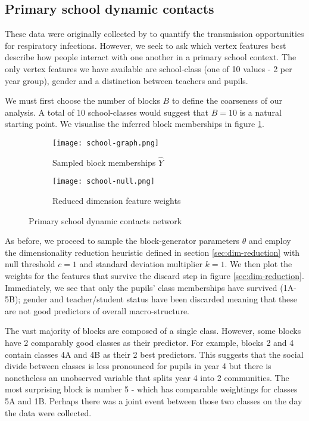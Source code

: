 \FloatBarrier
\subsection{Primary school dynamic contacts}

These data were originally collected by \citet{schools} to quantify the transmission opportunities for respiratory infections. However, we seek to ask which vertex features best describe how people interact with one another in a primary school context. The only vertex features we have available are school-class (one of 10 values - 2 per year group), gender and a distinction between teachers and pupils.

We must first choose the number of blocks $B$ to define the coarseness of our analysis. A total of 10 school-classes would suggest that $B=10$ is a natural starting point. We visualise the inferred block memberships in figure \ref{fig:school-graph}.
%
\begin{figure}[!h]
	\centering
	\begin{subfigure}{0.45\linewidth}
		\centering
		\texttt{[image: school-graph.png]}
		\caption{Sampled block memberships $\hat{Y}$}
		\label{fig:school-graph}
	\end{subfigure}
	\hfill
	\begin{subfigure}{0.45\linewidth}
		\centering
		\texttt{[image: school-null.png]}
		\caption{Reduced dimension feature weights}
		\label{fig:school-null}
	\end{subfigure}
	\caption{Primary school dynamic contacts network \cite{schools}}
\end{figure}

As before, we proceed to sample the block-generator parameters $\theta$ and employ the dimensionality reduction heuristic defined in section \ref{sec:dim-reduction} with null threshold $c=1$ and standard deviation multiplier $k=1$. We then plot the weights for the features that survive the discard step in figure \ref{sec:dim-reduction}. Immediately, we see that only the pupils' class memberships have survived (1A-5B); gender and teacher/student status have been discarded meaning that these are not good predictors of overall macro-structure.

The vast majority of blocks are composed of a single class. However, some blocks have 2 comparably good classes as their predictor. For example, blocks 2 and 4 contain classes 4A and 4B as their 2 best predictors. This suggests that the social divide between classes is less pronounced for pupils in year 4 but there is nonetheless an unobserved variable that splits year 4 into 2 communities. The most surprising block is number 5 - which has comparable weightings for classes 5A and 1B. Perhaps there was a joint event between those two classes on the day the data were collected.

